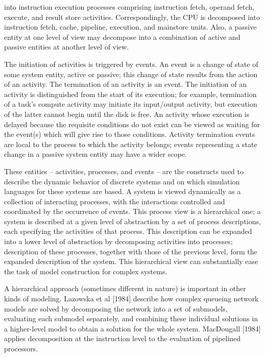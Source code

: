 \noindent into instruction execution processes comprising instruction fetch, operand
fetch, execute, and result store activities. Correspondingly, the CPU is
decomposed into instruction fetch, cache, pipeline, execution, and mainstore
units. Also, a passive entity at one level of view may decompose into a
combination of active and passive entities at another level of view.

The initiation of activities is triggered by events. An event is a change of
state of some system entity, active or passive; this change of state results
from the action of an activity. The termination of an activity is an event.
The initiation of an activity is distinguished from the start of its execution;
for example, termination of a task's compute activity may initiate its
input/output activity, but execution of the latter cannot begin until the disk
is free. An activity whose execution is delayed because the requisite
conditions do not exist can be viewed as waiting for the event(s) which will
give rise to those conditions. Activity termination events are local to the
process to which the activity belongs; events representing a state change in a
passive system entity may have a wider scope.

These entities -- activities, processes, and events -- are the constructs used
to describe the dynamic behavior of discrete systems and on which simulation
languages for these systems are based. A system is viewed dynamically as a
collection of interacting processes, with the interactions controlled and
coordinated by the occurrence of events. This process view is a hierarchical
one; a system is described at a given level of abstraction by a set of process
descriptions, each specifying the activities of that process. This description
can be expanded into a lower level of abstraction by decomposing activities
into processes; description of these processes, together with those of the
previous level, form the expanded description of the system. This hierarchical
view can substantially ease the task of model construction for complex systems.

A hierarchical approach (sometimes different in nature) is important in other
kinds of modeling. Lazowska et al [1984] describe how complex queueing network
models are solved by decomposing the network into a set of submodels,
evaluating each submodel separately, and combining these individual solutions
in a higher-level model to obtain a solution for the whole system. MacDougall
[1984] applies decomposition at the instruction level to the evaluation of
pipelined processors.

